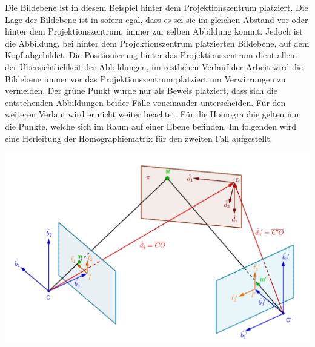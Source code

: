 Die Bildebene ist in diesem Beispiel hinter dem Projektionszentrum platziert. Die Lage der Bildebene ist in sofern egal, dass es sei sie im gleichen Abstand vor oder hinter dem Projektionszentrum, immer zur selben Abbildung kommt. Jedoch ist die Abbildung, bei hinter dem Projektionszentrum platzierten Bildebene, auf dem Kopf abgebildet. Die Positionierung hinter das Projektionszentrum dient allein der Übersichtlichkeit der Abbildungen, im restlichen Verlauf der Arbeit wird die Bildebene immer vor das Projektionszentrum platziert um Verwirrungen zu vermeiden. Der grüne Punkt wurde nur als Beweis platziert, dass sich die entstehenden Abbildungen beider Fälle voneinander unterscheiden. Für den weiteren Verlauf wird er nicht weiter beachtet. Für die Homographie gelten nur die Punkte, welche sich im Raum auf einer Ebene befinden. Im folgenden wird eine Herleitung der Homographiematrix für den zweiten Fall aufgestellt. 

\begin{minipage}{\linewidth}
	\centering
	\includegraphics[width=0.8\linewidth]{images/HomographieDP_beschriftet.png}
\end{minipage}\\

